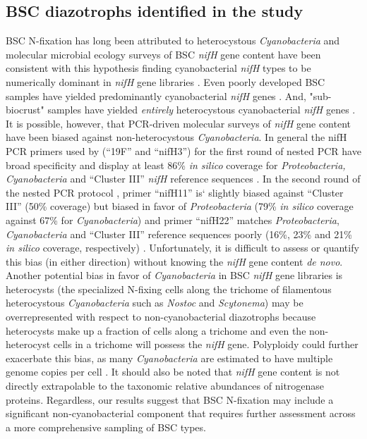 \subsection{BSC diazotrophs identified in the study} BSC N-fixation has long
been attributed to heterocystous \textit{Cyanobacteria} and molecular microbial
ecology surveys of BSC \textit{nifH} gene content have been consistent with
this hypothesis finding cyanobacterial \textit{nifH} types to be numerically
dominant in \textit{nifH} gene libraries \citep{Yeager,14766579,Yeager_2012}.
Even poorly developed BSC samples have yielded predominantly cyanobacterial
\textit{nifH} genes \citep{14766579}. And,
"sub-biocrust" samples have yielded \textit{entirely} heterocystous
cyanobacterial \textit{nifH} genes \citep{Yeager_2012}.
It is possible, however, that PCR-driven molecular surveys of \textit{nifH}
gene content have been biased against non-heterocystous \textit{Cyanobacteria}.
In general the nifH PCR primers used by \citet{Yeager,14766579,Yeager_2012}
(``19F'' and ``nifH3'') for the first round of nested PCR have broad
specificity and display at least 86\% \textit{in silico} coverage for
\textit{Proteobacteria, Cyanobacteria} and ``Cluster III'' \textit{nifH}
reference sequences \citep{Gaby_2012}. In the second round of the nested PCR
protocol \citep{Yeager,14766579,Yeager_2012}, primer ``nifH11'' is` slightly biased
against ``Cluster III'' (50\% coverage) but biased in favor of
\textit{Proteobacteria} (79\% \textit{in silico} coverage against 67\% for
\textit{Cyanobacteria}) and primer ``nifH22'' matches \textit{Proteobacteria},
\textit{Cyanobacteria} and ``Cluster III'' reference sequences poorly (16\%,
23\% and 21\% \textit{in silico} coverage, respectively) \citep{Gaby_2012}.
Unfortunately, it is difficult to assess or quantify this bias (in either
direction) without knowing the \textit{nifH} gene content \textit{de novo}.
Another potential bias in favor of \textit{Cyanobacteria} in BSC \textit{nifH}
gene libraries is heterocysts (the specialized N-fixing cells along the
trichome of filamentous heterocystous \textit{Cyanobacteria} such as
\textit{Nostoc} and \textit{Scytonema}) may be overrepresented with respect to
non-cyanobacterial diazotrophs because heterocysts make up a fraction of cells
along a trichome and even the non-heterocyst cells in a trichome will possess the
\textit{nifH} gene. Polyploidy could further exacerbate this bias, as many
\textit{Cyanobacteria} are estimated to have multiple genome copies per cell
\citep{Griese_2011}. It should also be noted that \textit{nifH} gene
content is not directly extrapolable to the taxonomic relative abundances of
nitrogenase proteins. Regardless, our results suggest that BSC N-fixation may
include a significant non-cyanobacterial component that requires further
assessment across a more comprehensive sampling of BSC types.

